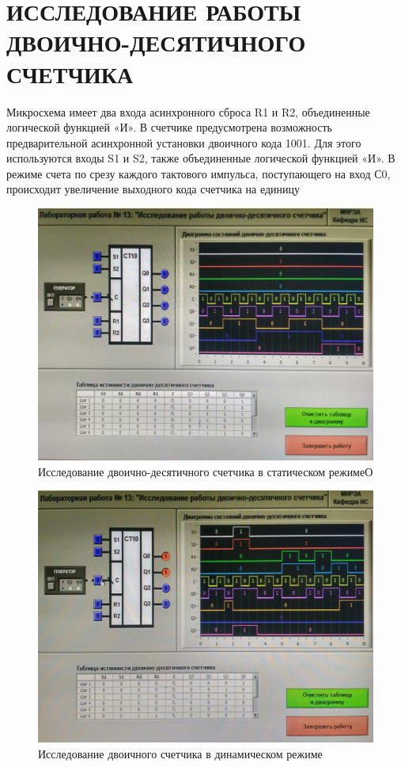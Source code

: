 \section{ИССЛЕДОВАНИЕ РАБОТЫ ДВОИЧНО-ДЕСЯТИЧНОГО СЧЕТЧИКА
}

Микросхема имеет два входа асинхронного сброса R1 и R2, объединенные логической функцией «И». В счетчике предусмотрена возможность предварительной асинхронной установки двоичного кода 1001. Для
этого используются входы S1 и S2, также объединенные логической функцией «И». В режиме счета по срезу каждого тактового импульса, поступающего на вход С0, происходит увеличение выходного кода счетчика на
единицу
\begin{figure}[H]
	\centering
	\includegraphics[width=0.95\linewidth]{imgs/13/1.jpg}
	\caption{Исследование двоично-десятичного счетчика в статическом режимеО}
	\label{fig:11_1}
\end{figure}

\begin{figure}[H]
	\centering
	\includegraphics[width=0.95\linewidth]{imgs/13/2.jpg}
	\caption{Исследование двоичного счетчика в динамическом режиме}
	\label{fig:13_2}
\end{figure}


